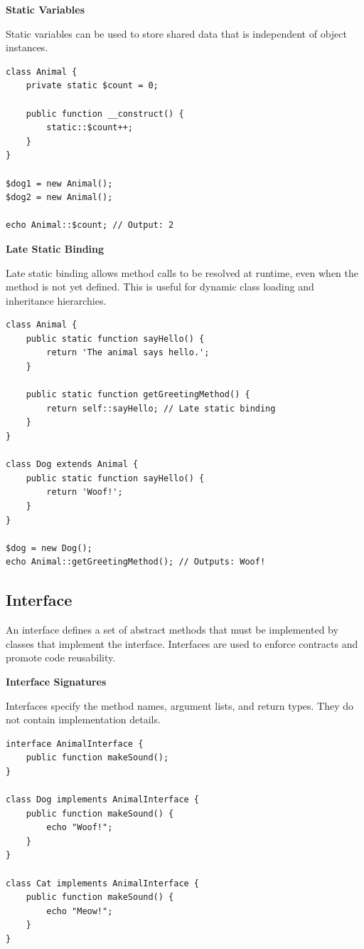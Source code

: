 \documentclass[11pt]{article}
\begin{document}
\textbf{Static Variables}

Static variables can be used to store shared data that is independent of
object instances.

\begin{verbatim}
class Animal {
    private static $count = 0;

    public function __construct() {
        static::$count++;
    }
}

$dog1 = new Animal();
$dog2 = new Animal();

echo Animal::$count; // Output: 2
\end{verbatim}

\textbf{Late Static Binding}

Late static binding allows method calls to be resolved at runtime, even
when the method is not yet defined. This is useful for dynamic class
loading and inheritance hierarchies.

\begin{verbatim}
class Animal {
    public static function sayHello() {
        return 'The animal says hello.';
    }

    public static function getGreetingMethod() {
        return self::sayHello; // Late static binding
    }
}

class Dog extends Animal {
    public static function sayHello() {
        return 'Woof!';
    }
}

$dog = new Dog();
echo Animal::getGreetingMethod(); // Outputs: Woof!
\end{verbatim}

\subsection{\textbf{Interface}}
\label{sec:org7144e98}
An interface defines a set of abstract methods that must be implemented
by classes that implement the interface. Interfaces are used to enforce
contracts and promote code reusability.

\textbf{Interface Signatures}

Interfaces specify the method names, argument lists, and return types.
They do not contain implementation details.

\begin{verbatim}
interface AnimalInterface {
    public function makeSound();
}

class Dog implements AnimalInterface {
    public function makeSound() {
        echo "Woof!";
    }
}

class Cat implements AnimalInterface {
    public function makeSound() {
        echo "Meow!";
    }
}
\end{verbatim}
\end{document}
